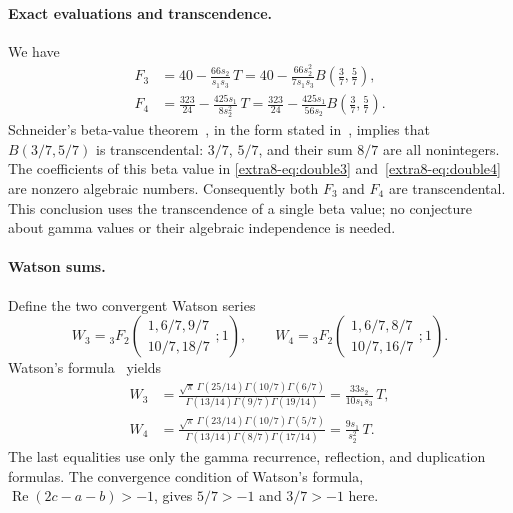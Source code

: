 \documentclass[11pt,a4paper]{article}
\theoremstyle{definition}
\theoremstyle{remark}
\numberwithin{equation}{section}
\begin{document}
\paragraph{Exact evaluations and transcendence.}
We have
\begin{align}
 F_3&=40-\frac{66s_2}{s_1s_3}\,T
     =40-\frac{66s_2^2}{7s_1s_3}
       B\left(\frac37,\frac57\right),\label{extra8-eq:double3}\\
 F_4&=\frac{323}{24}-\frac{425s_1}{8s_2^2}\,T
     =\frac{323}{24}-\frac{425s_1}{56s_2}
       B\left(\frac37,\frac57\right).\label{extra8-eq:double4}
\end{align}
Schneider's beta-value theorem~\cite{extra8-schneider}, in the form stated
in~\cite[Theorem~12]{extra8-waldschmidt}, implies that
$B(3/7,5/7)$ is transcendental: $3/7$, $5/7$, and their sum $8/7$
are all nonintegers.  The coefficients of this beta value in
\eqref{extra8-eq:double3} and~\eqref{extra8-eq:double4} are nonzero algebraic numbers.
Consequently both $F_3$ and $F_4$ are transcendental.
This conclusion uses the transcendence of a single beta value;
no conjecture about gamma values or their algebraic independence is needed.

\paragraph{Watson sums.}
Define the two convergent Watson series
\[
 W_3={}_3F_2\left(\begin{matrix}1,6/7,9/7\\10/7,18/7\end{matrix};1\right),
 \qquad
 W_4={}_3F_2\left(\begin{matrix}1,6/7,8/7\\10/7,16/7\end{matrix};1\right).
\]
Watson's formula~\cite[Eq.~16.4.6]{extra8-dlmf} yields
\begin{align}
 W_3&=\frac{\sqrt\pi\,\Gamma(25/14)\Gamma(10/7)\Gamma(6/7)}
 {\Gamma(13/14)\Gamma(9/7)\Gamma(19/14)}
 =\frac{33s_2}{10s_1s_3}\,T,\label{extra8-eq:double-w3}\\
 W_4&=\frac{\sqrt\pi\,\Gamma(23/14)\Gamma(10/7)\Gamma(5/7)}
 {\Gamma(13/14)\Gamma(8/7)\Gamma(17/14)}
 =\frac{9s_1}{s_2^2}\,T.\label{extra8-eq:double-w4}
\end{align}
The last equalities use only the gamma recurrence, reflection, and
duplication formulas.  The convergence condition of Watson's formula,
$\operatorname{Re}(2c-a-b)>-1$, gives $5/7>-1$ and $3/7>-1$ here.
\end{document}
